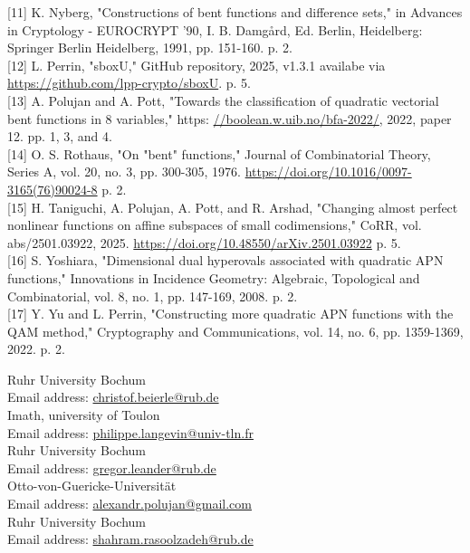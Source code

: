 \documentclass[10pt]{article}
\begin{document}
[11] K. Nyberg, "Constructions of bent functions and difference sets," in Advances in Cryptology - EUROCRYPT '90, I. B. Damgård, Ed. Berlin, Heidelberg: Springer Berlin Heidelberg, 1991, pp. 151-160. p. 2.\\[0pt]
[12] L. Perrin, "sboxU," GitHub repository, 2025, v1.3.1 availabe via \href{https://github.com/lpp-crypto/sboxU}{https://github.com/lpp-crypto/sboxU}. p. 5.\\[0pt]
[13] A. Polujan and A. Pott, "Towards the classification of quadratic vectorial bent functions in 8 variables," https: \href{//boolean.w.uib.no/bfa-2022/}{//boolean.w.uib.no/bfa-2022/}, 2022, paper 12. pp. 1, 3, and 4.\\[0pt]
[14] O. S. Rothaus, "On "bent" functions," Journal of Combinatorial Theory, Series A, vol. 20, no. 3, pp. 300-305, 1976. \href{https://doi.org/10.1016/0097-3165(76)90024-8}{https://doi.org/10.1016/0097-3165(76)90024-8} p. 2.\\[0pt]
[15] H. Taniguchi, A. Polujan, A. Pott, and R. Arshad, "Changing almost perfect nonlinear functions on affine subspaces of small codimensions," CoRR, vol. abs/2501.03922, 2025. \href{https://doi.org/10.48550/arXiv.2501.03922}{https://doi.org/10.48550/arXiv.2501.03922} p. 5.\\[0pt]
[16] S. Yoshiara, "Dimensional dual hyperovals associated with quadratic APN functions," Innovations in Incidence Geometry: Algebraic, Topological and Combinatorial, vol. 8, no. 1, pp. 147-169, 2008. p. 2.\\[0pt]
[17] Y. Yu and L. Perrin, "Constructing more quadratic APN functions with the QAM method," Cryptography and Communications, vol. 14, no. 6, pp. 1359-1369, 2022. p. 2.

Ruhr University Bochum\\
Email address: \href{mailto:christof.beierle@rub.de}{christof.beierle@rub.de}\\
Imath, university of Toulon\\
Email address: \href{mailto:philippe.langevin@univ-tln.fr}{philippe.langevin@univ-tln.fr}\\
Ruhr University Bochum\\
Email address: \href{mailto:gregor.leander@rub.de}{gregor.leander@rub.de}\\
Otto-von-Guericke-Universität\\
Email address: \href{mailto:alexandr.polujan@gmail.com}{alexandr.polujan@gmail.com}\\
Ruhr University Bochum\\
Email address: \href{mailto:shahram.rasoolzadeh@rub.de}{shahram.rasoolzadeh@rub.de}
\end{document}
